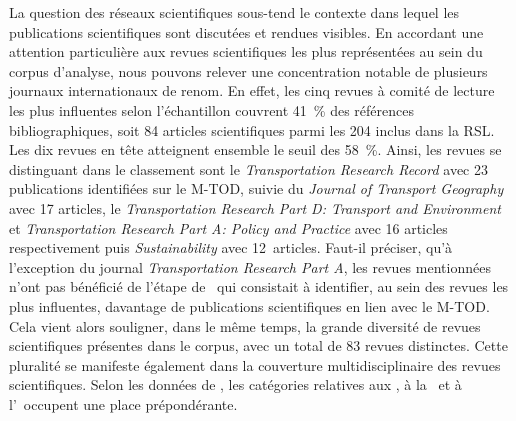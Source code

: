 \begin{refsegment}
La question des réseaux scientifiques sous-tend le contexte dans lequel les publications scientifiques sont discutées et rendues visibles. En accordant une attention particulière aux revues scientifiques les plus représentées au sein du corpus d'analyse, nous pouvons relever une concentration notable de plusieurs journaux internationaux de renom. En effet, les cinq revues à comité de lecture les plus influentes selon l'échantillon couvrent 41~\% des références bibliographiques, soit 84 articles scientifiques parmi les 204 inclus dans la \acrshort{RSL}. Les dix revues en tête atteignent ensemble le seuil des 58~\%. Ainsi, les revues se distinguant dans le classement sont le \textsl{Transportation Research Record} avec 23 publications identifiées sur le \acrshort{M-TOD}, suivie du \textsl{Journal of Transport Geography} avec 17 articles, le \foreignlanguage{english}{\textsl{Transportation Research Part D: Transport and Environment}} et \foreignlanguage{english}{\textsl{Transportation Research Part A: Policy and Practice}} avec 16 articles respectivement puis \textsl{Sustainability} avec 12~articles. Faut-il préciser, qu'à l'exception du journal \textsl{Transportation Research Part A}, les revues mentionnées n'ont pas bénéficié de l'étape de ~qui consistait à identifier, au sein des revues les plus influentes, davantage de publications scientifiques en lien avec le \acrshort{M-TOD}. Cela vient alors souligner, dans le même temps, la grande diversité de revues scientifiques présentes dans le corpus, avec un total de 83 revues distinctes. Cette pluralité se manifeste également dans la couverture multidisciplinaire des revues scientifiques. Selon les données de , les catégories relatives aux , à la ~et à l'~occupent une place prépondérante.%


\end{refsegment}
